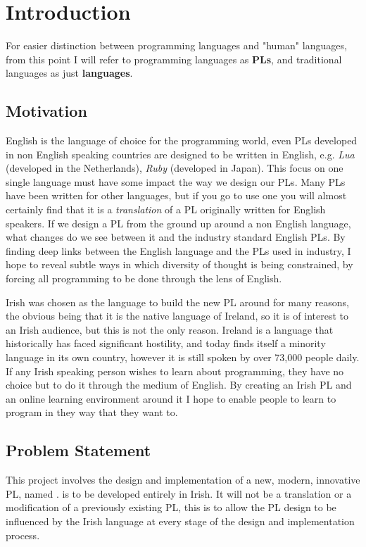 \chapter{Introduction}
For easier distinction between programming languages and "human" languages, from this point I will refer to programming languages as \textbf{PLs}, and traditional languages as just \textbf{languages}.

\section{Motivation}
English is the language of choice for the programming world, even PLs developed in non English speaking countries are designed to be written in English, e.g. \emph{Lua} (developed in the Netherlands), \emph{Ruby} (developed in Japan). This focus on one single language must have some impact the way we design our PLs. Many PLs have been written for other languages, but if you go to use one you will almost certainly find that it is a \emph{translation} of a PL originally written for English speakers\cite{wikipllist}. If we design a PL from the ground up around a non English language, what changes do we see between it and the industry standard English PLs. By finding deep links between the English language and the PLs used in industry, I hope to reveal subtle ways in which diversity of thought is being constrained, by forcing all programming to be done through the lens of English.

Irish was chosen as the language to build the new PL around for many reasons, the obvious being that it is the native language of Ireland, so it is of interest to an Irish audience, but this is not the only reason. Ireland is a language that historically has faced significant hostility, and today finds itself a minority language in its own country, however it is still spoken by over 73,000 people daily\cite{csoirish}. If any Irish speaking person wishes to learn about programming, they have no choice but to do it through the medium of English. By creating an Irish PL and an online learning environment around it I hope to enable people to learn to program in they way that they want to.

\section{Problem Statement}
This project involves the design and implementation of a new, modern, innovative PL, named \Setanta{}. \Setanta{} is to be developed entirely in Irish. It will not be a translation or a modification of a previously existing PL, this is to allow the PL design to be influenced by the Irish language at every stage of the design and implementation process.

